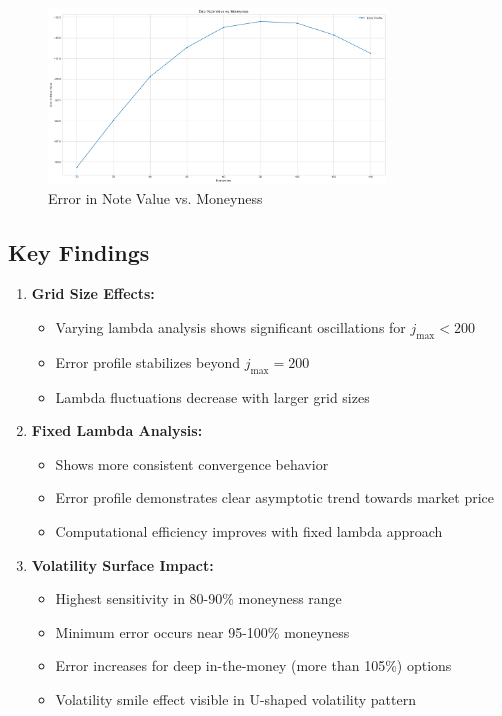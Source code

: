 \documentclass[12pt,a4paper]{article}
\begin{document}
\begin{itemize}
\begin{figure}[H]
    \centering
    \includegraphics[width=0.8\textwidth, keepaspectratio]{images_project_3/sens_vols.png}
    \caption{Error in Note Value vs. Moneyness}
    \label{fig:error_moneyness}
\end{figure}

\end{itemize}

\subsection*{Key Findings}

\begin{enumerate}
\item \textbf{Grid Size Effects:}
    \begin{itemize}
    \item Varying lambda analysis shows significant oscillations for \(j_{\text{max}} < 200\)
    \item Error profile stabilizes beyond \(j_{\text{max}} = 200\)
    \item Lambda fluctuations decrease with larger grid sizes
    \end{itemize}

\item \textbf{Fixed Lambda Analysis:}
    \begin{itemize}
    \item Shows more consistent convergence behavior
    \item Error profile demonstrates clear asymptotic trend towards market price
    \item Computational efficiency improves with fixed lambda approach
    \end{itemize}

\item \textbf{Volatility Surface Impact:}
    \begin{itemize}
    \item Highest sensitivity in 80-90\% moneyness range
    \item Minimum error occurs near 95-100\% moneyness
    \item Error increases for deep in-the-money (more than 105\%) options
    \item Volatility smile effect visible in U-shaped volatility pattern
    \end{itemize}
\end{enumerate}
\end{document}
